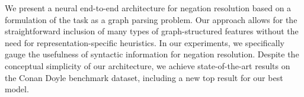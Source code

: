 We present a neural end-to-end architecture for negation resolution based on a formulation of the task as a graph parsing problem. Our approach allows for the straightforward inclusion of many types of graph-structured features without the need for representation-specific heuristics. In our experiments, we specifically gauge the usefulness of syntactic information for negation resolution. Despite the conceptual simplicity of our architecture, we achieve state-of-the-art results on the Conan Doyle benchmark dataset, including a new top result for our best model.
